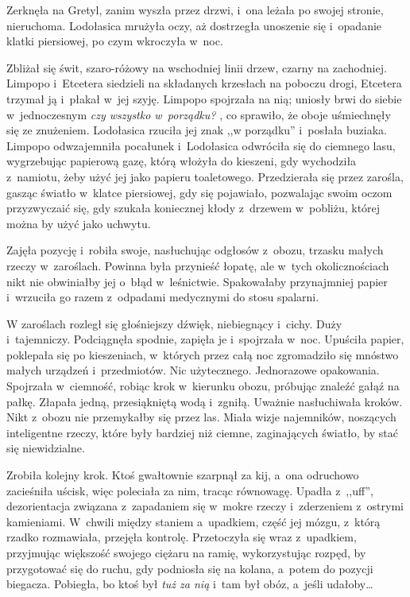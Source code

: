 \documentclass[oneside,polish,11pt,sfheadings]{mwbk}
\begin{document}
Zerknęła na Gretyl, zanim wyszła przez drzwi, i~ona leżała po swojej
stronie, nieruchoma. Lodołasica mrużyła oczy, aż dostrzegła unoszenie
się i~opadanie klatki piersiowej, po czym wkroczyła w~noc.

Zbliżał się świt, szaro-różowy na wschodniej linii drzew, czarny na
zachodniej. Limpopo i~Etcetera siedzieli na składanych krzesłach na
poboczu drogi, Etcetera trzymał ją i~płakał w~jej szyję. Limpopo
spojrzała na nią; uniosły brwi do siebie w~jednoczesnym \textit{czy
wszystko w~porządku? }, co sprawiło, że oboje uśmiechnęły się ze
znużeniem. Lodołasica rzuciła jej znak ,,w porządku'' i~posłała buziaka.
Limpopo odwzajemniła pocałunek i~Lodołasica odwróciła się do ciemnego
lasu, wygrzebując papierową gazę, którą włożyła do kieszeni, gdy
wychodziła z~namiotu, żeby użyć jej jako papieru toaletowego.
Przedzierała się przez zarośla, gasząc światło w~klatce piersiowej, gdy
się pojawiało, pozwalając swoim oczom przyzwyczaić się, gdy szukała
koniecznej kłody z~drzewem w~pobliżu, której można by użyć jako uchwytu.

Zajęła pozycję i~robiła swoje, nasłuchując odgłosów z~obozu, trzasku
małych rzeczy w~zaroślach. Powinna była przynieść łopatę, ale w~tych
okolicznościach nikt nie obwiniałby jej o~błąd w~leśnictwie. Spakowałaby
przynajmniej papier i~wrzuciła go razem z~odpadami medycznymi do stosu
spalarni.

W zaroślach rozległ się głośniejszy dźwięk, niebiegnący i~cichy. Duży i~tajemniczy. Podciągnęła spodnie, zapięła je i~spojrzała w~noc. Upuściła
papier, poklepała się po kieszeniach, w~których przez całą noc
zgromadziło się mnóstwo małych urządzeń i~przedmiotów. Nic użytecznego.
Jednorazowe opakowania. Spojrzała w~ciemność, robiąc krok w~kierunku
obozu, próbując znaleźć gałąź na pałkę. Złapała jedną, przesiąkniętą
wodą i~zgniłą. Uważnie nasłuchiwała kroków. Nikt z~obozu nie przemykałby
się przez las. Miała wizje najemników, noszących inteligentne rzeczy,
które były bardziej niż ciemne, zaginających światło, by stać się
niewidzialne.

Zrobiła kolejny krok. Ktoś gwałtownie szarpnął za kij, a~ona odruchowo
zacieśniła uścisk, więc poleciała za nim, tracąc równowagę. Upadła z~,,uff'', dezorientacja związana z~zapadaniem się w~mokre rzeczy i~zderzeniem z~ostrymi kamieniami. W~chwili między staniem a~upadkiem,
część jej mózgu, z~którą rzadko rozmawiała, przejęła kontrolę.
Przetoczyła się wraz z~upadkiem, przyjmując większość swojego ciężaru na
ramię, wykorzystując rozpęd, by przygotować się do ruchu, gdy podniosła
się na kolana, a~potem do pozycji biegacza. Pobiegła, bo ktoś był
\textit{tuż za nią} i~tam był obóz, a~jeśli udałoby\ldots 
\end{document}
